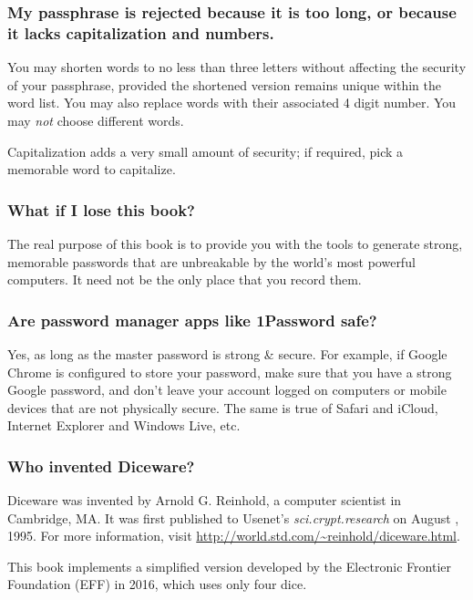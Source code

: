 \subsubsection{My passphrase is rejected because it is too long, or because it lacks capitalization and numbers.}

You may shorten words to no less than three letters without affecting the security of your passphrase, provided the shortened version remains unique within the word list. You may also replace words with their associated 4 digit number. You may \textit{not} choose different words.

Capitalization adds a very small amount of security; if required, pick a memorable word to capitalize.

\subsubsection{What if I lose this book?}

The real purpose of this book is to provide you with the tools to generate strong, memorable passwords that are unbreakable by the world's most powerful computers. It need not be the only place that you record them.

\subsubsection{Are password manager apps like 1Password safe?}

Yes, as long as the master password is strong \& secure. For example, if Google Chrome is configured to store your password, make sure that you have a strong Google password, and don't leave your account logged on computers or mobile devices that are not physically secure. The same is true of Safari and iCloud, Internet Explorer and Windows Live, etc.

\subsubsection{Who invented Diceware?}

Diceware was invented by Arnold G. Reinhold, a computer scientist in Cambridge, MA. It was first published to Usenet's \textit{sci.crypt.research} on August , 1995. For more information, visit \url{http://world.std.com/~reinhold/diceware.html}. 

This book implements a simplified version developed by the Electronic Frontier Foundation (EFF) in 2016, which uses only four dice.
 

